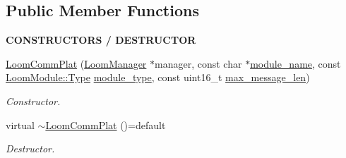 \subsection*{Public Member Functions}
\begin{Indent}{\bf C\+O\+N\+S\+T\+R\+U\+C\+T\+O\+RS / D\+E\+S\+T\+R\+U\+C\+T\+OR}\par
\begin{DoxyCompactItemize}
\item 
\hyperlink{class_loom_comm_plat_ae977f58b40bd6f292fc7e5a20b319ca4}{Loom\+Comm\+Plat} (\hyperlink{class_loom_manager}{Loom\+Manager} $\ast$manager, const char $\ast$\hyperlink{class_loom_module_adf6e68ad7e9fa2acfca7a8a280680764}{module\+\_\+name}, const \hyperlink{class_loom_module_aee91d0a75140d51ee428fc2d4417d865}{Loom\+Module\+::\+Type} \hyperlink{class_loom_module_a152d394f37236a2b159dae19da67eeb0}{module\+\_\+type}, const uint16\+\_\+t \hyperlink{class_loom_comm_plat_a2b4f69c2ec15028f5f281c3d1d399dba}{max\+\_\+message\+\_\+len})
\begin{DoxyCompactList}\small\item\em Constructor. \end{DoxyCompactList}\item 
virtual \hyperlink{class_loom_comm_plat_a88da37ecf287280aa166e25f4f947b37}{$\sim$\+Loom\+Comm\+Plat} ()=default
\begin{DoxyCompactList}\small\item\em Destructor. \end{DoxyCompactList}\end{DoxyCompactItemize}
\end{Indent}
